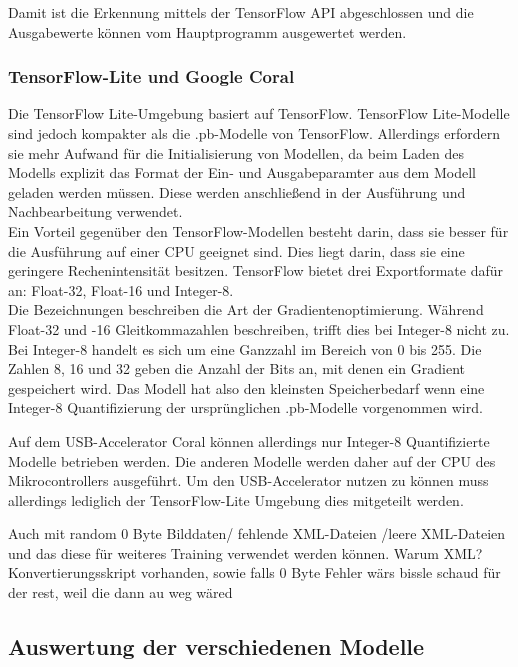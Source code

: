 Damit ist die Erkennung mittels der TensorFlow API abgeschlossen und die Ausgabewerte können vom Hauptprogramm ausgewertet werden.

\subsubsection{TensorFlow-Lite und Google Coral}

Die TensorFlow Lite-Umgebung basiert auf TensorFlow. TensorFlow Lite-Modelle sind jedoch kompakter als die .pb-Modelle von TensorFlow. Allerdings erfordern sie mehr Aufwand für die Initialisierung von Modellen, da beim Laden des Modells explizit das Format der Ein- und Ausgabeparamter aus dem Modell geladen werden müssen. Diese werden anschließend in der Ausführung und Nachbearbeitung verwendet.
\\
Ein Vorteil gegenüber den TensorFlow-Modellen besteht darin, dass sie besser für die Ausführung auf einer CPU geeignet sind. Dies liegt darin, dass sie eine geringere Rechenintensität besitzen. TensorFlow bietet drei Exportformate dafür an: Float-32, Float-16 und Integer-8.\\
Die Bezeichnungen beschreiben die Art der Gradientenoptimierung. Während Float-32 und -16 Gleitkommazahlen beschreiben, trifft dies bei Integer-8 nicht zu. Bei Integer-8 handelt es sich um eine Ganzzahl im Bereich von 0 bis 255. Die Zahlen 8, 16 und 32 geben die Anzahl der Bits an, mit denen ein Gradient gespeichert wird. Das Modell hat also den kleinsten Speicherbedarf wenn eine Integer-8 Quantifizierung der ursprünglichen .pb-Modelle vorgenommen wird. \cite{tens_zoo}

Auf dem USB-Accelerator Coral können allerdings nur Integer-8 Quantifizierte Modelle betrieben werden. Die anderen Modelle werden daher auf der CPU des Mikrocontrollers ausgeführt. Um den USB-Accelerator nutzen zu können muss allerdings lediglich der TensorFlow-Lite Umgebung dies mitgeteilt werden. \cite{coral_google}




Auch mit random 0 Byte Bilddaten/ fehlende XML-Dateien /leere XML-Dateien und das diese für weiteres Training verwendet werden können. Warum XML? Konvertierungsskript vorhanden, sowie falls 0 Byte Fehler wärs bissle schaud für der rest, weil die dann au weg wäred

\subsection{Auswertung der verschiedenen Modelle} \label{cap:Benchmarks}



